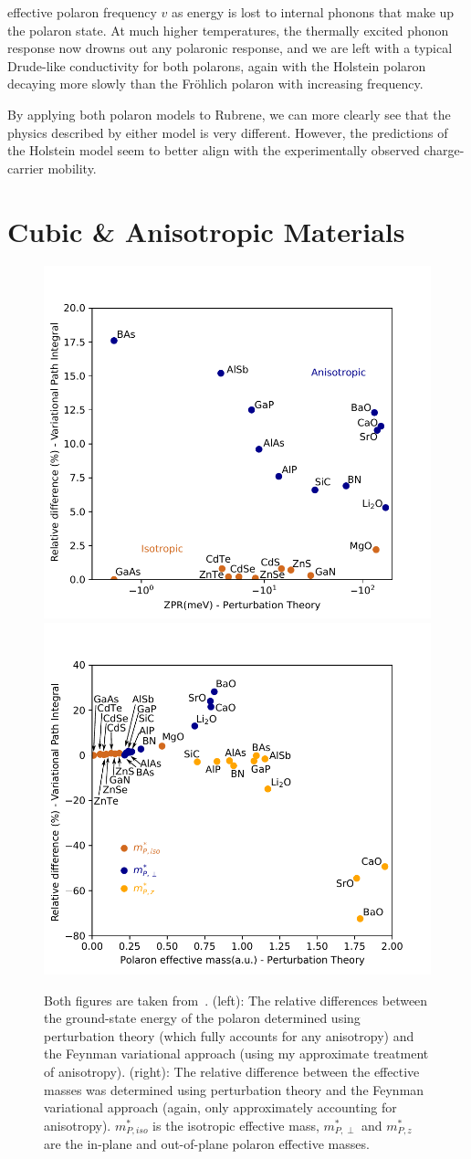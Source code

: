 effective polaron frequency $v$ as energy is lost to internal phonons that make up the polaron state. At much higher temperatures, the thermally excited phonon response now drowns out any polaronic response, and we are left with a typical Drude-like conductivity for both polarons, again with the Holstein polaron decaying more slowly than the Fr\"ohlich polaron with increasing frequency.

By applying both polaron models to Rubrene, we can more clearly see that the physics described by either model is very different. However, the predictions of the Holstein model seem to better align with the experimentally observed charge-carrier mobility.

\section{Cubic \& Anisotropic Materials}
\label{sec:chap-sixth-third}

\begin{figure}[t]
    \centering
    \includegraphics[width=.49\textwidth]{figures/ff_zpr.pdf}
    \includegraphics[width=.49\textwidth]{figures/ff_emass.pdf}
    
    \caption{Both figures are taken from~\cite{guster_frohlich_2021}. (left): The relative differences between the ground-state energy of the polaron determined using perturbation theory (which fully accounts for any anisotropy) and the Feynman variational approach (using my approximate treatment of anisotropy). (right): The relative difference between the effective masses was determined using perturbation theory and the Feynman variational approach (again, only approximately accounting for anisotropy). $m^*_{P, iso}$ is the isotropic effective mass, $m^*_{P, \perp}$ and $m^*_{P, z}$ are the in-plane and out-of-plane polaron effective masses.}
    \label{fig:anisotropy}
\end{figure}

